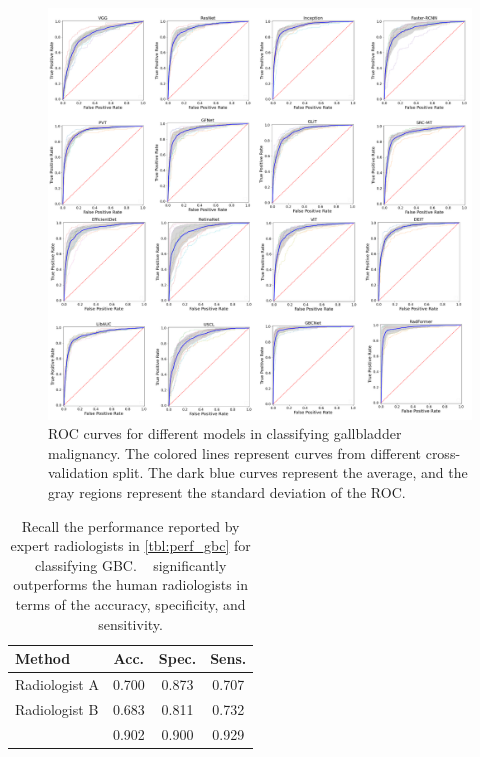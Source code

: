 %
\begin{figure}[h]
    \centering
    \includegraphics[width=0.7\linewidth]{figs/xai-roc.png}
    \caption[ROC curves]{ROC curves for different models in classifying gallbladder malignancy. The colored lines represent curves from different cross-validation split. The dark blue curves represent the average, and the gray regions represent the standard deviation of the ROC.}
    \label{fig:roc_kfold}
\end{figure}
%
\begin{table}[t]
	\centering
    \footnotesize
	\begin{tabular}{lccc}
		\toprule
		\textbf{Method}	& \textbf{Acc.} & \textbf{Spec.} & \textbf{Sens.} \\
		\midrule
		Radiologist A & 0.700 & 0.873 & 0.707  \\
		Radiologist B & 0.683 & 0.811 & 0.732  \\
		\midrule%
		\radformer & 0.902 & 0.900 & 0.929 \\
		\bottomrule
	\end{tabular}
	\caption[Comparison of \radformer with the radiologists]{Recall the performance reported by expert radiologists in \cref{tbl:perf_gbc} for classifying GBC.%
    ~ \radformer significantly outperforms the human radiologists in terms of the accuracy, specificity, and sensitivity.%
    }
	\label{tab:perf_human}
\end{table}
